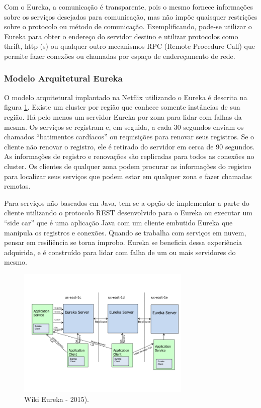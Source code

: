 Com o Eureka, a comunicação é transparente, pois o mesmo fornece informações sobre os serviços desejados para comunicação, mas não impõe quaisquer restrições sobre o protocolo ou método de comunicação. Exemplificando, pode-se utilizar o Eureka para obter o endereço do servidor destino e utilizar protocolos como thrift, http (s) ou qualquer outro mecanismos RPC (Remote Procedure Call) que permite fazer conexões ou chamadas por espaço de endereçamento de rede. 

\subsubsection{Modelo Arquitetural Eureka}
O modelo arquitetural implantado na Netflix utilizando o Eureka é  descrita na figura \ref{fig:wiki-eureka-est}. Existe um cluster por região que conhece somente instâncias de sua região. Há pelo menos um servidor Eureka por zona para lidar com falhas da mesma. Os serviços se registram e, em seguida, a cada 30 segundos enviam os chamados “batimentos cardíacos” ou requisições para renovar seus registros. Se o cliente não renovar o registro, ele é retirado do servidor em cerca de 90 segundos. As informações de registro e renovações são replicadas para todos as conexões no cluster. Os clientes de qualquer zona podem procurar as informações do registro para localizar seus serviços que podem estar em qualquer zona e fazer chamadas remotas.

Para serviços não baseados em Java, tem-se a opção de implementar a parte do cliente utilizando o protocolo REST desenvolvido para o Eureka ou executar um “side car” que é uma aplicação Java com um cliente embutido Eureka que manipula os registros e conexões. Quando se trabalha com serviços em nuvem, pensar em resiliência se torna ímprobo. Eureka se beneficia dessa experiência adquirida, e é construído para lidar com falha de um ou mais servidores do mesmo.

\begin{figure}[h]
\centering
\includegraphics[height=6.2cm]{imagens/figura6}
\caption{Wiki Eureka - 2015).}
\label{fig:wiki-eureka-est}
\end{figure}







